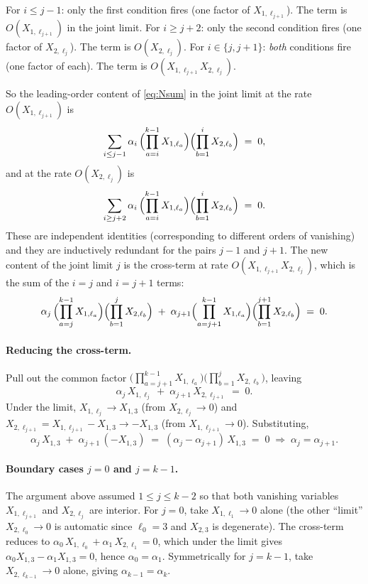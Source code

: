 \documentclass[11pt]{article}
\theoremstyle{definition}
\begin{document}
For $i \leq j-1$: only the first condition fires (one factor of $X_{1,\ell_{j+1}}$). The term is $O(X_{1,\ell_{j+1}})$ in the joint limit.
For $i \geq j+2$: only the second condition fires (one factor of $X_{2,\ell_j}$). The term is $O(X_{2,\ell_j})$.
For $i \in \{j, j+1\}$: \emph{both} conditions fire (one factor of each). The term is $O(X_{1,\ell_{j+1}} X_{2,\ell_j})$.

So the leading-order content of \eqref{eq:Nsum} in the joint limit at the rate $O(X_{1,\ell_{j+1}})$ is
\begin{equation}\label{eq:rateN1}
\sum_{i \leq j-1} \alpha_i \,\Bigl(\prod_{a=i}^{k-1} X_{1,\ell_a}\Bigr) \Bigl(\prod_{b=1}^{i} X_{2,\ell_b}\Bigr) \;=\; 0,
\end{equation}
and at the rate $O(X_{2,\ell_j})$ is
\begin{equation}\label{eq:rateN2}
\sum_{i \geq j+2} \alpha_i \,\Bigl(\prod_{a=i}^{k-1} X_{1,\ell_a}\Bigr) \Bigl(\prod_{b=1}^{i} X_{2,\ell_b}\Bigr) \;=\; 0.
\end{equation}
These are independent identities (corresponding to different orders of vanishing) and they are inductively redundant for the pairs $j-1$ and $j+1$. The new content of the joint limit $j$ is the cross-term at rate $O(X_{1,\ell_{j+1}} X_{2,\ell_j})$, which is the sum of the $i = j$ and $i = j+1$ terms:
\begin{equation}\label{eq:cross}
\alpha_j \,\Bigl(\prod_{a=j}^{k-1} X_{1,\ell_a}\Bigr) \Bigl(\prod_{b=1}^{j} X_{2,\ell_b}\Bigr) \;+\; \alpha_{j+1} \Bigl(\prod_{a=j+1}^{k-1} X_{1,\ell_a}\Bigr) \Bigl(\prod_{b=1}^{j+1} X_{2,\ell_b}\Bigr) \;=\; 0.
\end{equation}

\paragraph{Reducing the cross-term.} Pull out the common factor $\bigl(\prod_{a=j+1}^{k-1} X_{1,\ell_a}\bigr)\bigl(\prod_{b=1}^{j} X_{2,\ell_b}\bigr)$, leaving
\[
\alpha_j \, X_{1,\ell_j} \;+\; \alpha_{j+1}\, X_{2,\ell_{j+1}} \;=\; 0.
\]
Under the limit, $X_{1,\ell_j} \to X_{1,3}$ (from $X_{2,\ell_j} \to 0$) and $X_{2,\ell_{j+1}} = X_{1,\ell_{j+1}} - X_{1,3} \to -X_{1,3}$ (from $X_{1,\ell_{j+1}} \to 0$). Substituting,
\[
\alpha_j\, X_{1,3} \;+\; \alpha_{j+1}\,(-X_{1,3}) \;=\; (\alpha_j - \alpha_{j+1})\,X_{1,3} \;=\; 0 \;\Longrightarrow\; \alpha_j = \alpha_{j+1}.
\]

\paragraph{Boundary cases $j=0$ and $j=k-1$.} The argument above assumed $1 \leq j \leq k-2$ so that both vanishing variables $X_{1,\ell_{j+1}}$ and $X_{2,\ell_j}$ are interior. For $j = 0$, take $X_{1,\ell_1} \to 0$ alone (the other ``limit'' $X_{2,\ell_0} \to 0$ is automatic since $\ell_0 = 3$ and $X_{2,3}$ is degenerate). The cross-term reduces to $\alpha_0\,X_{1,\ell_0} + \alpha_1\,X_{2,\ell_1} = 0$, which under the limit gives $\alpha_0 X_{1,3} - \alpha_1 X_{1,3} = 0$, hence $\alpha_0 = \alpha_1$. Symmetrically for $j = k-1$, take $X_{2,\ell_{k-1}} \to 0$ alone, giving $\alpha_{k-1} = \alpha_k$.
\end{document}
